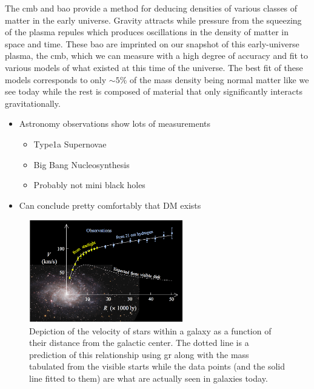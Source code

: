 The \gls{cmb} and \gls{bao} provide a method for deducing densities of various classes of matter
in the early universe. Gravity attracts while pressure from the squeezing of the plasma repules
which produces oscillations in the density of matter in space and time. These \gls{bao} are
imprinted on our snapshot of this early-universe plasma, the \gls{cmb}, which we can measure with
a high degree of accuracy and fit to various models of what existed at this time of the universe.
The best fit of these models corresponds to only $\sim 5\%$ of the mass density being normal matter
like we see today while the rest is composed of material that only significantly interacts gravitationally.


\begin{itemize}
      \item Astronomy observations show lots of measurements
            \begin{itemize}
                  \item Type1a Supernovae \cite{type1a-supernova-2010}
                  \item Big Bang Nucleosynthesis \cite{nucleosynthesis-1998}
                  \item Probably not mini black holes \cite{constraints-primordial-black-holes-2021}
            \end{itemize}
      \item Can conclude pretty comfortably that DM exists
\end{itemize}

\begin{figure}
      \centering
      \includegraphics[width=0.6\textwidth]{figures/theory/rotation-curve-evidence-for-dm.png}
      \caption{
            Depiction of the velocity of stars within a galaxy as a function of their distance
            from the galactic center. The dotted line is a prediction of this relationship using
            \gls{gr} along with the mass tabulated from the visible starts while the data points
            (and the solid line fitted to them) are what are actually seen in galaxies today.
      }
      \label{fig:rotation-curve}
\end{figure}

